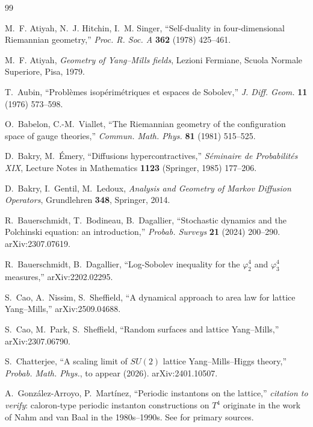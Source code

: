 \documentclass[11pt,a4paper]{amsart}
\theoremstyle{definition}
\begin{document}
\begin{thebibliography}{99}

M.~F. Atiyah, N.~J. Hitchin, I.~M. Singer,
``Self-duality in four-dimensional Riemannian geometry,''
\emph{Proc. R. Soc. A} \textbf{362} (1978) 425--461.

M.~F. Atiyah,
\emph{Geometry of Yang--Mills fields},
Lezioni Fermiane, Scuola Normale Superiore, Pisa, 1979.

T.~Aubin,
``Probl\`emes isop\'erim\'etriques et espaces de Sobolev,''
\emph{J. Diff. Geom.} \textbf{11} (1976) 573--598.

O.~Babelon, C.-M.~Viallet,
``The Riemannian geometry of the configuration space of gauge theories,''
\emph{Commun. Math. Phys.} \textbf{81} (1981) 515--525.

D.~Bakry, M.~\'Emery,
``Diffusions hypercontractives,''
\emph{S\'eminaire de Probabilit\'es XIX},
Lecture Notes in Mathematics \textbf{1123} (Springer, 1985) 177--206.

D.~Bakry, I.~Gentil, M.~Ledoux,
\emph{Analysis and Geometry of Markov Diffusion Operators},
Grundlehren \textbf{348}, Springer, 2014.

R.~Bauerschmidt, T.~Bodineau, B.~Dagallier,
``Stochastic dynamics and the Polchinski equation: an introduction,''
\emph{Probab. Surveys} \textbf{21} (2024) 200--290.
arXiv:2307.07619.

R.~Bauerschmidt, B.~Dagallier,
``Log-Sobolev inequality for the $\varphi^4_2$ and $\varphi^4_3$ measures,''
arXiv:2202.02295.

S.~Cao, A.~Nissim, S.~Sheffield,
``A dynamical approach to area law for lattice Yang--Mills,''
arXiv:2509.04688.

S.~Cao, M.~Park, S.~Sheffield,
``Random surfaces and lattice Yang--Mills,''
arXiv:2307.06790.

S.~Chatterjee,
``A scaling limit of $SU(2)$ lattice Yang--Mills--Higgs theory,''
\emph{Probab. Math. Phys.}, to appear (2026).
arXiv:2401.10507.

A.~Gonz\'alez-Arroyo, P.~Mart\'inez,
``Periodic instantons on the lattice,''
\emph{citation to verify}: caloron-type periodic instanton constructions
on $T^4$ originate in the work of Nahm and van Baal in the
1980s--1990s. See \cite{Nahm1983,vanBaal1996} for primary sources.


\end{thebibliography}
\end{document}
